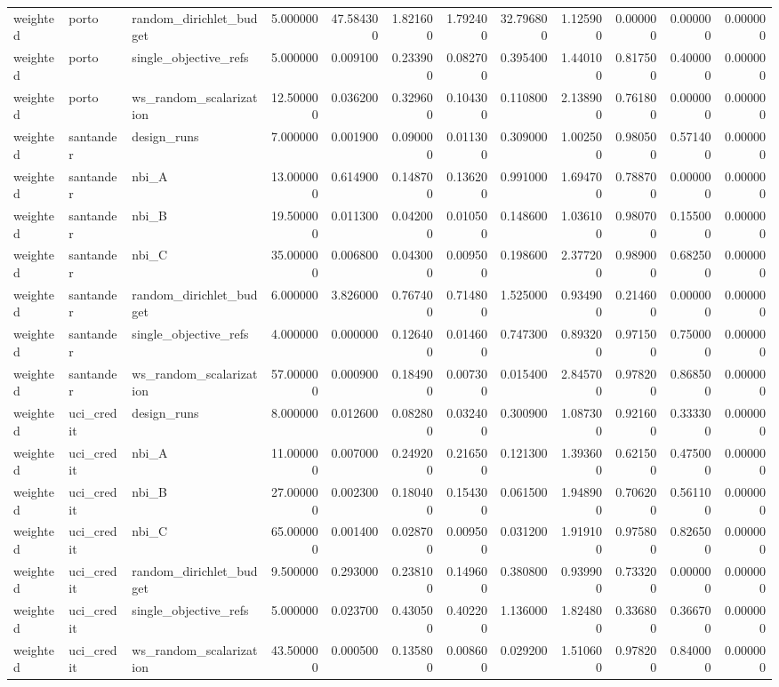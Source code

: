 \begin{landscape}
\begin{longtable}{lllrrrrrrrrr}
weighted & porto & random\_dirichlet\_budget & 5.000000 & 47.584300 & 1.821600 & 1.792400 & 32.796800 & 1.125900 & 0.000000 & 0.000000 & 0.000000 \\
weighted & porto & single\_objective\_refs & 5.000000 & 0.009100 & 0.233900 & 0.082700 & 0.395400 & 1.440100 & 0.817500 & 0.400000 & 0.000000 \\
weighted & porto & ws\_random\_scalarization & 12.500000 & 0.036200 & 0.329600 & 0.104300 & 0.110800 & 2.138900 & 0.761800 & 0.000000 & 0.000000 \\
weighted & santander & design\_runs & 7.000000 & 0.001900 & 0.090000 & 0.011300 & 0.309000 & 1.002500 & 0.980500 & 0.571400 & 0.000000 \\
weighted & santander & nbi\_A & 13.000000 & 0.614900 & 0.148700 & 0.136200 & 0.991000 & 1.694700 & 0.788700 & 0.000000 & 0.000000 \\
weighted & santander & nbi\_B & 19.500000 & 0.011300 & 0.042000 & 0.010500 & 0.148600 & 1.036100 & 0.980700 & 0.155000 & 0.000000 \\
weighted & santander & nbi\_C & 35.000000 & 0.006800 & 0.043000 & 0.009500 & 0.198600 & 2.377200 & 0.989000 & 0.682500 & 0.000000 \\
weighted & santander & random\_dirichlet\_budget & 6.000000 & 3.826000 & 0.767400 & 0.714800 & 1.525000 & 0.934900 & 0.214600 & 0.000000 & 0.000000 \\
weighted & santander & single\_objective\_refs & 4.000000 & 0.000000 & 0.126400 & 0.014600 & 0.747300 & 0.893200 & 0.971500 & 0.750000 & 0.000000 \\
weighted & santander & ws\_random\_scalarization & 57.000000 & 0.000900 & 0.184900 & 0.007300 & 0.015400 & 2.845700 & 0.978200 & 0.868500 & 0.000000 \\
weighted & uci\_credit & design\_runs & 8.000000 & 0.012600 & 0.082800 & 0.032400 & 0.300900 & 1.087300 & 0.921600 & 0.333300 & 0.000000 \\
weighted & uci\_credit & nbi\_A & 11.000000 & 0.007000 & 0.249200 & 0.216500 & 0.121300 & 1.393600 & 0.621500 & 0.475000 & 0.000000 \\
weighted & uci\_credit & nbi\_B & 27.000000 & 0.002300 & 0.180400 & 0.154300 & 0.061500 & 1.948900 & 0.706200 & 0.561100 & 0.000000 \\
weighted & uci\_credit & nbi\_C & 65.000000 & 0.001400 & 0.028700 & 0.009500 & 0.031200 & 1.919100 & 0.975800 & 0.826500 & 0.000000 \\
weighted & uci\_credit & random\_dirichlet\_budget & 9.500000 & 0.293000 & 0.238100 & 0.149600 & 0.380800 & 0.939900 & 0.733200 & 0.000000 & 0.000000 \\
weighted & uci\_credit & single\_objective\_refs & 5.000000 & 0.023700 & 0.430500 & 0.402200 & 1.136000 & 1.824800 & 0.336800 & 0.366700 & 0.000000 \\
weighted & uci\_credit & ws\_random\_scalarization & 43.500000 & 0.000500 & 0.135800 & 0.008600 & 0.029200 & 1.510600 & 0.978200 & 0.840000 & 0.000000 \\
\end{longtable}\endgroup

\end{landscape}

